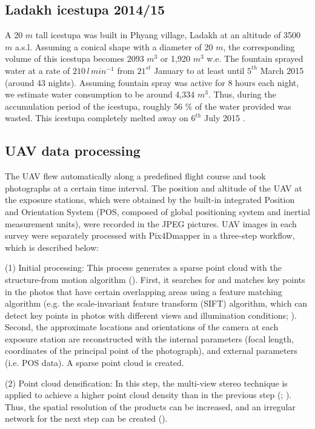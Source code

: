 \documentclass[utf8]{frontiersSCNS}
\begin{document}
\begin{itemize}
\subsection{Ladakh icestupa 2014/15} \label{sec:ladakhloss}

A 20 $m$ tall icestupa \citep{iceheight} was built in Phyang village, Ladakh at an altitude of 3500 $m$ a.s.l.
Assuming a conical shape with a diameter of 20 $m$, the corresponding volume of this icestupa becomes 2093 $m^3$ or
1,920 $m^3$ w.e. The fountain sprayed water at a rate of $210\, l\,min^{-1}$ \citep{waterinput} from $21^{st}$
January \citep{waterstart} to at least until $5^{th}$ March 2015 \citep{waterend} (around 43 nights). Assuming
fountain spray was active for 8 hours each night, we estimate water consumption to be around 4,334 $m^3$. Thus,
during the accumulation period of the icestupa, roughly 56 \% of the water provided was wasted.  This icestupa
completely melted away on $6^{th}$ July 2015 \citep{coneends}.

\subsection{UAV data processing} \label{sec:uav}
The UAV flew automatically along a predefined flight course and took photographs at a certain time interval. The
position and altitude of the UAV at the exposure stations, which were obtained by the built-in integrated
Position and Orientation System (POS, composed of global positioning system and inertial measurement units),
were recorded in the JPEG pictures. UAV images in each survey were separately processed with Pix4Dmapper in a
three-step workflow, which is described below:

(1) Initial processing: This process generates a sparse point cloud with the structure-from motion algorithm
(\cite{Turner_2012}). First, it searches for and matches key points in the photos that have certain overlapping
areas using a feature matching algorithm (e.g. the scale-invariant feature transform (SIFT) algorithm, which can
detect key points in photos with different views and illumination conditions; \cite{Lowe_2004}). Second, the
approximate locations and orientations of the camera at each exposure station are reconstructed with the internal
parameters (focal length, coordinates of the principal point of the photograph), and external parameters (i.e. POS
data). A sparse point cloud is created.

(2) Point cloud densification: In this step, the multi-view stereo technique is applied to achieve a higher point
cloud density than in the previous step (\cite{Furukawa_2010}; \cite{Molg_2017}). Thus, the spatial resolution of
the products can be increased, and an irregular network for the next step can be created (\cite{Kung_2011}).


\end{itemize}
\end{document}
